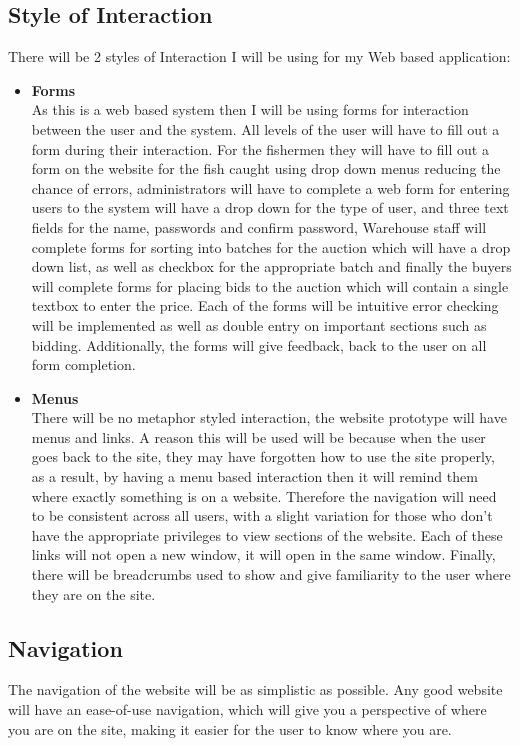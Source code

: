 \documentclass{article}
\begin{document}
\subsection{Style of Interaction}
There will be 2 styles of Interaction I will be using for my Web based application:
\begin{itemize}
	\item \textbf{Forms} \\
	As this is a web based system then I will be using forms for interaction between the user and the system. All levels of the user will have to fill out a form during their interaction. For the fishermen they will have to fill out a form on the website for the fish caught using drop down menus reducing the chance of errors, administrators will have to complete a web form for entering users to the system will have a drop down for the type of user, and three text fields for the name, passwords and confirm password, Warehouse staff will complete forms for sorting into batches for the auction which will have a drop down list, as well as checkbox for the appropriate batch and finally the buyers will complete forms for placing bids to the auction which will contain a single textbox to enter the price. Each of the forms will be intuitive error checking will be implemented as well as double entry on important sections such as bidding. Additionally, the forms will give feedback, back to the user on all form completion. 
	\item \textbf{Menus} \\
	There will be no metaphor styled interaction, the website prototype will have menus and links. A reason this will be used will be because when the user goes back to the site, they may have forgotten how to use the site properly, as a result, by having a menu based interaction then it will remind them where exactly something is on a website. Therefore the navigation will need to be consistent across all users, with a slight variation for those who don't have the appropriate privileges to view sections of the website. Each of these links will not open a new window, it will open in the same window. Finally, there will be breadcrumbs used to show and give familiarity to the user where they are on the site.
\end{itemize} 
\subsection{Navigation}
The navigation of the website will be as simplistic as possible. Any good website will have an ease-of-use navigation, which will give you a perspective of where you are on the site, making it easier for the user to know where you are.\cite{Navigation}
\end{document}
